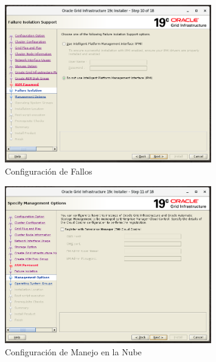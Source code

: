 \documentclass{article}
\begin{document}
\begin{figure}[H]
		\begin{center}
			\includegraphics[width=0.80\textwidth]{grid_install_10_failure_issolation.png}
		\end{center}
		\caption{Configuración de Fallos}
\end{figure}

\begin{figure}[H]
		\begin{center}
			\includegraphics[width=0.80\textwidth]{grid_install_11_management_options.png}
		\end{center}
		\caption{Configuración de Manejo en la Nube}
\end{figure}
\end{document}
